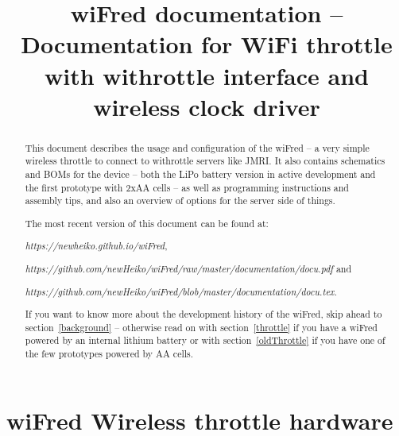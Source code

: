 \documentclass[11pt,a4paper]{scrartcl}
\date{\vhCurrentDate}
\author{\vhListAllAuthors}
\title{wiFred documentation -- Documentation for WiFi throttle with withrottle interface and wireless clock driver}
\begin{document}
\thispagestyle{empty}
\maketitle

\begin{abstract}

  This document describes the usage and configuration of the wiFred -- a very simple wireless throttle to connect to withrottle servers like JMRI. It also contains schematics and BOMs for the device -- both the LiPo battery version in active development and the first prototype with 2xAA cells -- as well as programming instructions and assembly tips, and also an overview of options for the server side of things.

The most recent version of this document can be found at:

\textit{https://newheiko.github.io/wiFred},

\textit{https://github.com/newHeiko/wiFred/raw/master/documentation/docu.pdf} and

\textit{https://github.com/newHeiko/wiFred/blob/master/documentation/docu.tex}.

If you want to know more about the development history of the wiFred, skip ahead to section~\ref{background} -- otherwise read on with section~\ref{throttle} if you have a wiFred powered by an internal lithium battery or with section~\ref{oldThrottle} if you have one of the few prototypes powered by AA cells.

\end{abstract}

\clearpage

\tableofcontents

\clearpage

\section{wiFred Wireless throttle hardware} \label{throttle}
\end{document}
